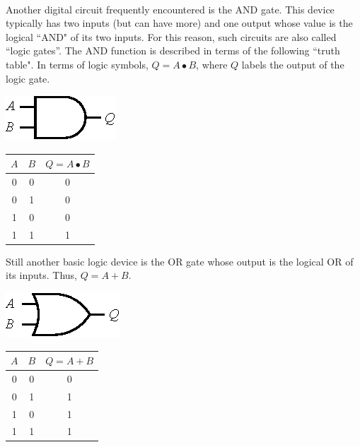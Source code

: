 \documentclass[12pt,oneside,openany,letterpaper]{article}
\begin{document}
~

\noindent Another digital circuit frequently encountered is the AND gate. This device typically has
two inputs (but can have more) and one output whose value is the logical ``AND" of its two
inputs. For this reason, such circuits are also called “logic gates”. The AND function is
described in terms of the following ``truth table". In terms of logic symbols, $Q = A \bullet B$, where $Q$ labels the output of the logic gate.

\begin{center}
\begin{minipage}[c]{0.3\textwidth}
\includegraphics[width=4 cm]{and.eps}
\end{minipage}
\begin{minipage}[c]{0.25\textwidth}
\begin{tabular}{cc|c}
$A$ & $B$ & $Q=A\bullet B$\\
\hline
 0 & 0 & 0\\
 0 & 1 & 0\\
 1 & 0 & 0\\
 1 & 1 & 1
\end{tabular}
\end{minipage}
\end{center}


\clearpage 

\noindent Still another basic logic device is the OR gate whose output is the logical OR of its
inputs. Thus, $Q = A+B$.

\begin{center}
\begin{minipage}[c]{0.3\textwidth}
\includegraphics[width=4 cm]{or.eps}
\end{minipage}
\begin{minipage}[c]{0.25\textwidth}
\begin{tabular}{cc|c}
$A$ & $B$ & $Q=A+B$\\
\hline
 0 & 0 & 0\\
 0 & 1 & 1\\
 1 & 0 & 1\\
 1 & 1 & 1
\end{tabular}
\end{minipage}
\end{center}
\end{document}
